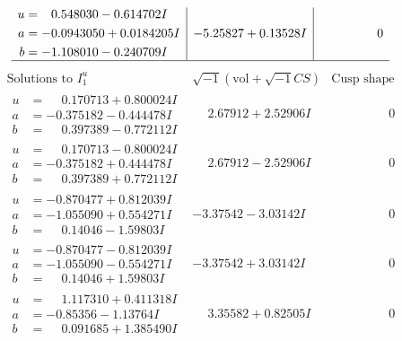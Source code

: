 \documentclass[1p]{elsarticle_modified}
\theoremstyle{definition}
\newcommand{\I}{\sqrt{-1}}
\begin{document}
$$\begin{array}{c|c|c}
\begin{aligned}
u &= \phantom{-}0.548030 - 0.614702 I \\
a &= -0.0943050 + 0.0184205 I \\
b &= -1.108010 - 0.240709 I\end{aligned}
 & -5.25827 + 0.13528 I & \phantom{-0.000000 } 0\\
 \hline 
 \end{array}$$\newpage$$\begin{array}{c|c|c}  
\text{Solutions to }I^u_{1}& \I (\text{vol} + \sqrt{-1}CS) & \text{Cusp shape}\\
 \hline 
\begin{aligned}
u &= \phantom{-}0.170713 + 0.800024 I \\
a &= -0.375182 - 0.444478 I \\
b &= \phantom{-}0.397389 - 0.772112 I\end{aligned}
 & \phantom{-}2.67912 + 2.52906 I & \phantom{-0.000000 } 0 \\ \hline\begin{aligned}
u &= \phantom{-}0.170713 - 0.800024 I \\
a &= -0.375182 + 0.444478 I \\
b &= \phantom{-}0.397389 + 0.772112 I\end{aligned}
 & \phantom{-}2.67912 - 2.52906 I & \phantom{-0.000000 } 0 \\ \hline\begin{aligned}
u &= -0.870477 + 0.812039 I \\
a &= -1.055090 + 0.554271 I \\
b &= \phantom{-}0.14046 - 1.59803 I\end{aligned}
 & -3.37542 - 3.03142 I & \phantom{-0.000000 } 0 \\ \hline\begin{aligned}
u &= -0.870477 - 0.812039 I \\
a &= -1.055090 - 0.554271 I \\
b &= \phantom{-}0.14046 + 1.59803 I\end{aligned}
 & -3.37542 + 3.03142 I & \phantom{-0.000000 } 0 \\ \hline\begin{aligned}
u &= \phantom{-}1.117310 + 0.411318 I \\
a &= -0.85356 - 1.13764 I \\
b &= \phantom{-}0.091685 + 1.385490 I\end{aligned}
 & \phantom{-}3.35582 + 0.82505 I & \phantom{-0.000000 } 0 \\ \hline\begin{aligned}

\end{aligned}
\end{array}$$
\end{document}
